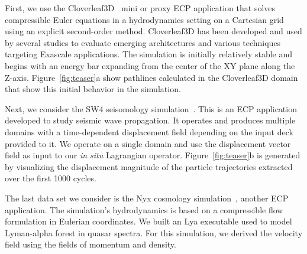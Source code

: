 First, we use the Cloverleaf3D~\cite{mallinson2013cloverleaf} mini or proxy ECP application that solves compressible Euler equations in a hydrodynamics setting on a Cartesian grid using an explicit second-order method. 
%
Cloverleaf3D has been developed and used by several studies to evaluate emerging architectures and various techniques targeting Exascale applications.
%
The simulation is initially relatively stable and begins with an energy bar expanding from the center of the XY plane along the Z-axis. 
%
Figure~\ref{fig:teaser}a show pathlines calculated in the Cloverleaf3D domain that show this initial behavior in the simulation.

Next, we consider the SW4 seisomology simulation~\cite{petersson2015wave}.
%
This is an ECP application developed to study seismic wave propagation.
%
It operates and produces multiple domains with a time-dependent displacement field depending on the input deck provided to it.
%
We operate on a single domain and use the displacement vector field as input to our \textit{in situ} Lagrangian operator.
%
Figure~\ref{fig:teaser}b is generated by visualizing the displacement magnitude of the particle trajectories extracted over the first 1000 cycles.
%
%
%

The last data set we consider is the Nyx cosmology simulation~\cite{almgren2013nyx}, another ECP application.
%
The simulation's hydrodynamics is based on a compressible flow formulation in Eulerian coordinates. 
%
We built an Lya executable used to model Lyman-alpha forest in quasar spectra.
%
For this simulation, we derived the velocity field using the fields of momentum and density.
%
%
%
%
%
%
%


